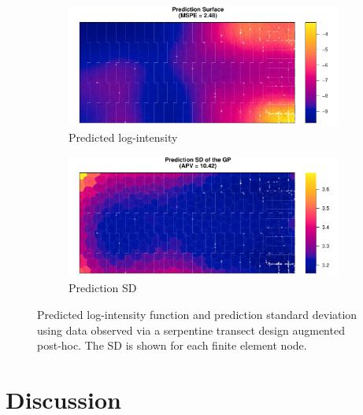 \documentclass[review]{elsarticle}
\begin{document}
\begin{figure}

\begin{subfigure}{5in}
\includegraphics[width=5in]{../graphics/lambda-Aug-LGCP000004.pdf}
\caption{Predicted log-intensity}
\label{lambdaaug}
\end{subfigure}

\begin{subfigure}{5in}
\includegraphics[width=5in]{../graphics/lambdaSD-Aug-LGCP000004.pdf}
\caption{Prediction SD}
\label{sdaug}
\end{subfigure}

\caption{Predicted log-intensity function and prediction standard deviation
using data observed via a serpentine transect design augmented post-hoc. The
SD is shown for each finite element node.}
\label{aug}
\end{figure}


\section{Discussion}
\end{document}
